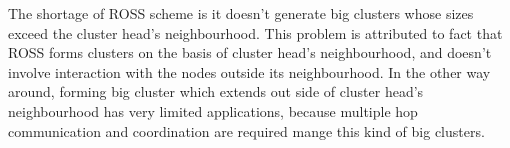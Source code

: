\documentclass[journal,comsoc]{IEEEtran}
\theoremstyle{mytheoremstyle}
\theoremstyle{mytheoremstyle}
\theoremstyle{mytheoremstyle}
\begin{document}
The shortage of ROSS scheme is it doesn't generate big clusters whose sizes exceed the cluster head's neighbourhood.
This problem is attributed to fact that ROSS forms clusters on the basis of cluster head's neighbourhood, and doesn't involve interaction with the nodes outside its neighbourhood.
In the other way around, forming big cluster which extends out side of cluster head's neighbourhood has very limited applications, because multiple hop communication and coordination are required mange this kind of big clusters.











%
\end{document}
